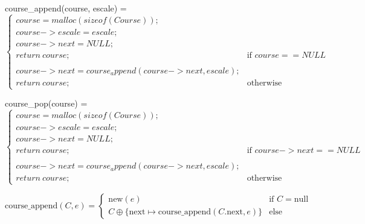 course\_append(course, escale) = $
                \begin{cases}
                    course = malloc(sizeof(Course)); \\
                    course->escale = escale; \\
                    course->next = NULL; \\
                    return\ course; & \text{if } course == NULL \\
                    \\
                    course->next = course_append(course->next, escale);\\
                    return\ course; & \text{otherwise}
                \end{cases} $

course\_pop(course) = $
                \begin{cases}
                    course = malloc(sizeof(Course)); \\
                    course->escale = escale; \\
                    course->next = NULL; \\
                    return\ course; & \text{if } course->next == NULL \\
                    \\
                    course->next = course_append(course->next, escale);\\
                    return\ course; & \text{otherwise}
                \end{cases} $

\[
\text{course\_append}(C, e) =
\begin{cases}
    \text{new}(e) & \text{if } C = \text{null} \\
    C \oplus \{\text{next} \mapsto \text{course\_append}(C.\text{next}, e)\} & \text{else}
\end{cases}
\]












